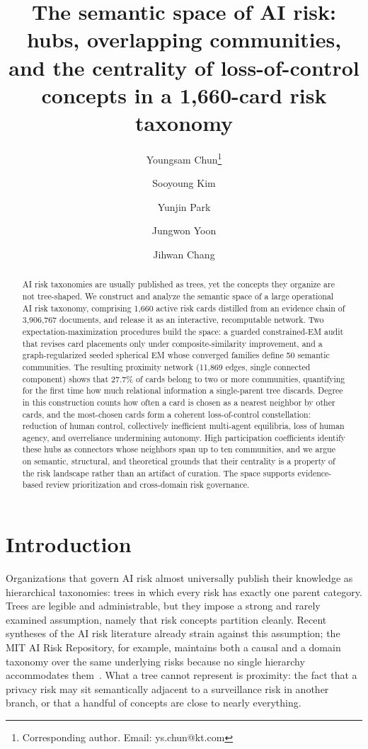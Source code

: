 \documentclass[11pt,a4paper]{article}
\title{\bfseries The semantic space of AI risk: hubs, overlapping communities, and the centrality of loss-of-control concepts in a 1,660-card risk taxonomy}
\author[1]{Youngsam Chun\thanks{Corresponding author. Email: ys.chun@kt.com}}
\author[1]{Sooyoung Kim}
\author[1]{Yunjin Park}
\author[1]{Jungwon Yoon}
\author[1]{Jihwan Chang}
\affil[1]{Responsible AI Department, Frontier AI Lab, KT Corporation, Seoul, Republic of Korea}
\date{}
\begin{document}
\maketitle

\begin{abstract}
AI risk taxonomies are usually published as trees, yet the concepts they organize are not tree-shaped. We construct and analyze the semantic space of a large operational AI risk taxonomy, comprising 1,660 active risk cards distilled from an evidence chain of 3,906,767 documents, and release it as an interactive, recomputable network. Two expectation-maximization procedures build the space: a guarded constrained-EM audit that revises card placements only under composite-similarity improvement, and a graph-regularized seeded spherical EM whose converged families define 50 semantic communities. The resulting proximity network (11,869 edges, single connected component) shows that 27.7\% of cards belong to two or more communities, quantifying for the first time how much relational information a single-parent tree discards. Degree in this construction counts how often a card is chosen as a nearest neighbor by other cards, and the most-chosen cards form a coherent loss-of-control constellation: reduction of human control, collectively inefficient multi-agent equilibria, loss of human agency, and overreliance undermining autonomy. High participation coefficients identify these hubs as connectors whose neighbors span up to ten communities, and we argue on semantic, structural, and theoretical grounds that their centrality is a property of the risk landscape rather than an artifact of curation. The space supports evidence-based review prioritization and cross-domain risk governance.
\end{abstract}

\section*{Introduction}

Organizations that govern AI risk almost universally publish their knowledge as hierarchical taxonomies: trees in which every risk has exactly one parent category. Trees are legible and administrable, but they impose a strong and rarely examined assumption, namely that risk concepts partition cleanly. Recent syntheses of the AI risk literature already strain against this assumption; the MIT AI Risk Repository, for example, maintains both a causal and a domain taxonomy over the same underlying risks because no single hierarchy accommodates them~\cite{slattery2024}. What a tree cannot represent is proximity: the fact that a privacy risk may sit semantically adjacent to a surveillance risk in another branch, or that a handful of concepts are close to nearly everything.
\end{document}
